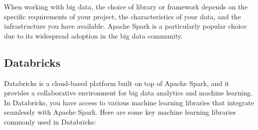 \documentclass[
]{book}
\begin{document}
When working with big data, the choice of library or framework depends on the specific requirements of your project, the characteristics of your data, and the infrastructure you have available. Apache Spark is a particularly popular choice due to its widespread adoption in the big data community.

\hypertarget{databricks}{%
\subsection{Databricks}\label{databricks}}

Databricks is a cloud-based platform built on top of Apache Spark, and it provides a collaborative environment for big data analytics and machine learning. In Databricks, you have access to various machine learning libraries that integrate seamlessly with Apache Spark. Here are some key machine learning libraries commonly used in Databricks:
\end{document}
